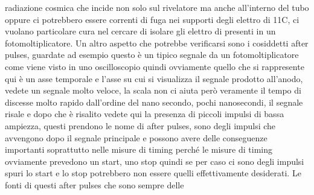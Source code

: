 {radiazione cosmica che incide non solo sul rivelatore ma anche all'interno del tubo oppure ci potrebbero essere correnti di fuga nei supporti degli elettro di 11C, ci vuolano particolare cura nel cercare di isolare gli elettro di presenti in un fotomoltiplicatore. Un altro aspetto che potrebbe verificarsi sono i cosiddetti after pulses, guardate ad esempio questo è un tipico segnale da un fotomoltiplicatore come viene visto in uno oscilloscopio quindi ovviamente quello che si rappresente qui è un asse temporale e l'asse su cui si visualizza il segnale prodotto all'anodo, vedete un segnale molto veloce, la scala non ci aiuta però veramente il tempo di discesse molto rapido dall'ordine del nano secondo, pochi nanosecondi, il segnale risale e dopo che è risalito vedete qui la presenza di piccoli impulsi di bassa ampiezza, questi prendono le nome di after pulses, sono degli impulsi che avvengono dopo il segnale principale e possono avere delle conseguenze importanti soprattutto nelle misure di timing perché le misure di timing ovviamente prevedono un start, uno stop quindi se per caso ci sono degli impulsi spuri lo start e lo stop potrebbero non essere quelli effettivamente desiderati. Le fonti di questi after pulses che sono sempre delle 

}
